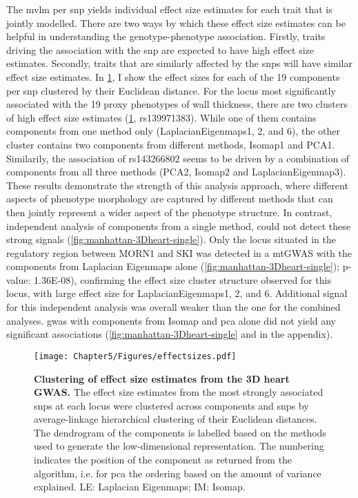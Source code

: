 %
The \gls{mvlm} per \gls{snp} yields individual effect size estimates for each trait that is jointly modelled. There are two ways by which these effect size estimates can be helpful in understanding the genotype-phenotype association. Firstly, traits driving the association with the \gls{snp} are expected to have high effect size estimates. Secondly, traits that are similarly affected by the \glspl{snp} will have similar effect size estimates.  In \cref{fig:effectsizes-heart}, I show the effect sizes for each of the \num{19} components per \gls{snp} clustered by their Euclidean distance. For the locus most significantly associated with the \num{19} proxy phenotypes of wall thickness, there are two clusters of high effect size estimates (\cref{fig:effectsizes-heart}, rs139971383). While one of them contains components from one method only (LaplacianEigenmaps1, 2, and 6), the other cluster contains two components from different methods, Isomap1 and PCA1. Similarily, the association of rs143266802 seems to be driven by a combination of components from all three methods (PCA2, Isomap2 and LaplacianEigenmap3). These results demonstrate the strength of this analysis approach, where different aspects of phenotype morphology are captured by different methods that can then jointly represent a wider aspect of the phenotype structure. In contrast, independent analysis of components from a single method, could not detect these strong signals (\cref{fig:manhattan-3Dheart-single}). Only the locus situated in the regulatory region between MORN1 and SKI was detected in a mtGWAS with the components from Laplacian Eigenmaps alone (\cref{fig:manhattan-3Dheart-single}); p-value: \num{1.36E-08}), confirming the effect size cluster structure observed for this locus, with large effect size for LaplacianEigenmaps1, 2, and 6. Additional signal for this independent analysis was overall weaker than the one for the combined analyses. \gls{gwas} with components from Isomap and \gls{pca} alone did not yield any significant associations (\cref{fig:manhattan-3Dheart-single} and  in the appendix). 
%
\begin{figure}[hbtp]
	\centering
	\texttt{[image: Chapter5/Figures/effectsizes.pdf]}
	\caption[\textbf{Clustering of effect size estimates from the 3D heart GWAS. }]{\textbf{Clustering of effect size estimates from the 3D heart GWAS. } The effect size estimates from the most strongly associated \glspl{snp}  at each locus were clustered across components and \glspl{snp}  by average-linkage hierarchical clustering of their Euclidean distances. The dendrogram of the components is labelled based on the methods used to generate the low-dimensional representation. The numbering indicates the position of the component as returned from the algorithm, i.e. for \gls{pca}  the ordering based on the amount of variance explained. LE: Laplacian Eigenmaps; IM: Isomap.} 
	 	\label{fig:effectsizes-heart}
\end{figure}
